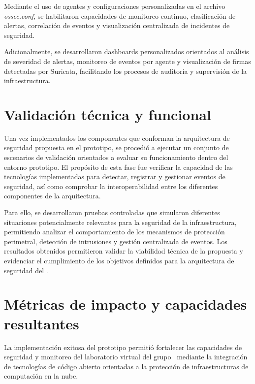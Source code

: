 Mediante el uso de agentes y configuraciones personalizadas en el archivo \textit{ossec.conf}, se habilitaron capacidades de monitoreo 
continuo, clasificación de alertas, correlación de eventos y visualización centralizada de incidentes de seguridad.

Adicionalmente, se desarrollaron dashboards personalizados orientados al análisis de severidad de alertas, monitoreo de eventos por agente 
y visualización de firmas detectadas por Suricata, facilitando los procesos de auditoría y supervisión de la infraestructura.

\section{Validación técnica y funcional}
\noindent

Una vez implementados los componentes que conforman la arquitectura de seguridad propuesta en el prototipo, se procedió a 
ejecutar un conjunto de escenarios de validación orientados a evaluar su funcionamiento dentro del entorno prototipo. El 
propósito de esta fase fue verificar la capacidad de las tecnologías implementadas para detectar, registrar y gestionar 
eventos de seguridad, así como comprobar la interoperabilidad entre los diferentes componentes de la arquitectura.

Para ello, se desarrollaron pruebas controladas que simularon diferentes situaciones potencialmente relevantes para la 
seguridad de la infraestructura, permitiendo analizar el comportamiento de los mecanismos de protección perimetral, 
detección de intrusiones y gestión centralizada de eventos. Los resultados obtenidos permitieron validar la viabilidad 
técnica de la propuesta y evidenciar el cumplimiento de los objetivos definidos para la arquitectura de seguridad del \GRID.

\section{Métricas de impacto y capacidades resultantes}
\noindent

La implementación exitosa del prototipo permitió fortalecer las capacidades de seguridad y monitoreo del laboratorio virtual del grupo 
\GRID\ mediante la integración de tecnologías de código abierto orientadas a la protección de infraestructuras de computación en la nube.


